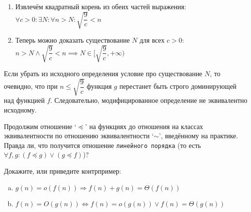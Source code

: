 \begin{solution}
\begin{enumerate}[(a)]
\begin{enumerate}[1.]
                \item Извлечём квадратный корень из обеих частей выражения:
                    \hfill \break
                    $\forall c > 0 : \exists N : \forall n > N : \sqrt{\dfrac{9}{c}} < n$

                \item Теперь можно доказать существование $N$ для всех $c > 0$:
                    \hfill \break
                    $n > N \land \sqrt{\dfrac{9}{c}} < n \implies N \in [\sqrt{\dfrac{9}{c}}, +\infty)$

                    \leavevmode\vspace{1pt}
                    
                    \qedsymbol
            \end{enumerate}

            Если убрать из исходного определения условие про существование $N$, то очевидно, что при $n \le \sqrt{\dfrac{9}{c}}$ функция $g$ перестанет быть строго доминирующей над функцией $f$.
            Следовательно, модифицированное определение не эквивалентно исходному.
    \end{enumerate}
\end{solution}


\begin{problem}
    Продолжим отношение `$\preceq$' на функциях до отношения на классах эквивалентности по отношению эквивалентности `$\sim$', введённому на практике. Правда ли, что получится отношение \texttt{линейного порядка} (то есть $\forall f, g: (f \preceq g) \lor (g \preceq f)$)?
\end{problem}

\begin{solution}
    \leavevmode\vspace{1pt}
    
\end{solution}


\begin{problem}
    Докажите, или приведите контрпример:
    \begin{enumerate}[(a)]
        \item $g(n) = o(f(n)) \Rightarrow f(n) + g(n) = \Theta(f(n))$
        \item $f(n) = O(g(n)) \Leftrightarrow f(n) = o(g(n)) \lor f(n) = \Theta(g(n))$
    \end{enumerate}
\end{problem}

